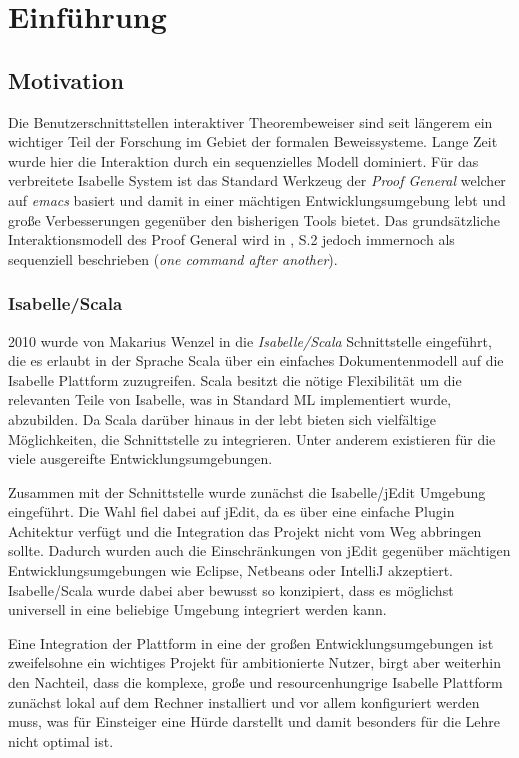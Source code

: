 \chapter{Einführung}

\section{Motivation}

Die Benutzerschnittstellen interaktiver Theorembeweiser sind seit längerem ein wichtiger Teil der
Forschung im Gebiet der formalen Beweissysteme. Lange Zeit wurde hier die Interaktion durch ein
sequenzielles \textit{} Modell dominiert. Für das verbreitete Isabelle System ist das
Standard Werkzeug der \textit{Proof General} welcher auf \textit{emacs} basiert und damit in einer
mächtigen Entwicklungsumgebung lebt und große Verbesserungen gegenüber den bisherigen Tools bietet.
Das grundsätzliche Interaktionsmodell des Proof General wird in \cite{iscala}, S.2 jedoch immernoch
als sequenziell beschrieben (\textit{\glqq one command after another\grqq}). 

\subsection{Isabelle/Scala}

2010 wurde von Makarius Wenzel in \cite{iscala} die \textit{Isabelle/Scala} Schnittstelle
eingeführt, die es erlaubt in der Sprache Scala über ein einfaches Dokumentenmodell auf die Isabelle
Plattform zuzugreifen. Scala besitzt die nötige Flexibilität um die relevanten Teile von Isabelle,
was in Standard ML implementiert wurde, abzubilden. Da Scala darüber hinaus in der  lebt
bieten sich vielfältige Möglichkeiten, die Schnittstelle zu integrieren. Unter anderem existieren
für die  viele ausgereifte Entwicklungsumgebungen.

Zusammen mit der Schnittstelle wurde zunächst die Isabelle/jEdit Umgebung eingeführt. Die Wahl fiel
dabei auf jEdit, da es über eine einfache Plugin Achitektur verfügt und die Integration das Projekt
nicht vom Weg abbringen sollte. Dadurch wurden auch die Einschränkungen von jEdit gegenüber
mächtigen Entwicklungsumgebungen wie Eclipse, Netbeans oder IntelliJ akzeptiert. Isabelle/Scala
wurde dabei aber bewusst so konzipiert, dass es möglichst universell in eine beliebige Umgebung
integriert werden kann.

Eine Integration der Plattform in eine der großen Entwicklungsumgebungen ist zweifelsohne ein
wichtiges Projekt für ambitionierte Nutzer, birgt aber weiterhin den Nachteil, dass die komplexe,
große und resourcenhungrige Isabelle Plattform zunächst lokal auf dem Rechner installiert und vor
allem konfiguriert werden muss, was für Einsteiger eine Hürde darstellt und damit besonders für die
Lehre nicht optimal ist.

